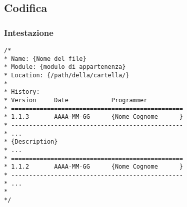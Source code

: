 

\subsection{Codifica}

\subsubsection{Intestazione}

\begin{lstlisting}
/*
* Name: {Nome del file}
* Module: {modulo di appartenenza}
* Location: {/path/della/cartella/}
*
* History:
* Version     Date            Programmer    
* ================================================
* 1.1.3       AAAA-MM-GG      {Nome Cognome      }
* ------------------------------------------------
* ...
* {Description}
* ...
* ================================================
* 1.1.2       AAAA-MM-GG      {Nome Cognome      }
* ------------------------------------------------
* ...
*
*/
\end{lstlisting}

